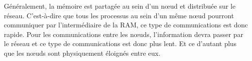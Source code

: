 

%

%
%
%
%
%

Généralement, la mémoire est partagée au sein d'un nœud et distribuée sur le réseau.
C'est-à-dire que tous les processus au sein d'un même nœud pourront communiquer par l'intermédiaire de la RAM, ce type de communications est donc rapide.
Pour les communications entre les nœuds, l'information devra passer par le réseau et ce type de communications est donc plus lent.
Et ce d'autant plus que les nœuds sont physiquement éloignés entre eux.

